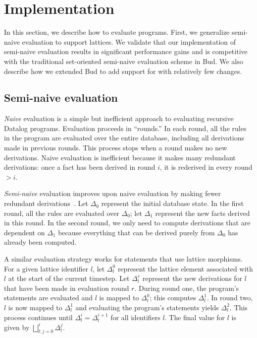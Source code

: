 \section{Implementation}
\label{sec:impl}

In this section, we describe how to evaluate \lang programs. First, we
generalize semi-naive evaluation to support lattices. We validate that our
implementation of semi-naive evaluation results in significant performance gains
and is competitive with the traditional set-oriented semi-naive evaluation
scheme in Bud. We also describe how we extended Bud to add support for \lang
with relatively few changes.

\subsection{Semi-naive evaluation}
\label{sec:lattice-eval-strat}
\emph{Naive} evaluation is a simple but inefficient approach to evaluating
recursive Datalog programs. Evaluation proceeds in ``rounds.'' In each round, all
the rules in the program are evaluated over the entire database, including all
derivations made in previous rounds. This process stops when a round makes no
new derivations. Naive evaluation is inefficient because it makes many redundant
derivations: once a fact has been derived in round $i$, it is rederived in every
round $>i$.

\emph{Semi-naive} evaluation improves upon naive evaluation by making fewer
redundant derivations~\cite{Balbin1987}. Let $\Delta_0$ represent the initial
database state. In the first round, all the rules are evaluated over $\Delta_0$;
let $\Delta_1$ represent the new facts derived in this round. In the second
round, we only need to compute derivations that are dependent on $\Delta_1$
because everything that can be derived purely from $\Delta_0$ has already been
computed.

A similar evaluation strategy works for \lang statements that use lattice
morphisms. For a given lattice identifier $l$, let $\Delta_l^0$ represent the
lattice element associated with $l$ at the start of the current timestep. Let
$\Delta^r_l$ represent the new derivations for $l$ that have been made in
evaluation round $r$. During round one, the program's statements are evaluated
and $l$ is mapped to $\Delta_l^0$; this computes $\Delta^1_l$. In round two, $l$
is now mapped to $\Delta^1_l$ and evaluating the program's statements yields
$\Delta^2_l$. This process continues until $\Delta^i_l = \Delta^{i+1}_l$ for all
identifiers $l$.  The final value for $l$ is given by $\bigsqcup_{l: j=0}^i
\Delta^j_l$.

